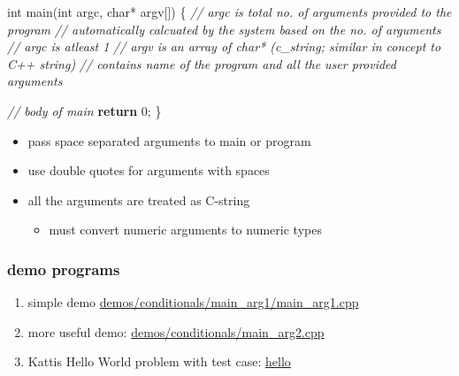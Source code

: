 \documentclass[11pt]{article}
\providecommand{\tightlist}{%
      \setlength{\itemsep}{0pt}\setlength{\parskip}{0pt}}
\newenvironment{Shaded}{}{}
\newcommand{\DataTypeTok}[1]{\textcolor[rgb]{0.56,0.13,0.00}{{#1}}}
\newcommand{\DecValTok}[1]{\textcolor[rgb]{0.25,0.63,0.44}{{#1}}}
\newcommand{\StringTok}[1]{\textcolor[rgb]{0.25,0.44,0.63}{{#1}}}
\newcommand{\CommentTok}[1]{\textcolor[rgb]{0.38,0.63,0.69}{\textit{{#1}}}}
\newcommand{\NormalTok}[1]{{#1}}
\newcommand{\ControlFlowTok}[1]{\textcolor[rgb]{0.00,0.44,0.13}{\textbf{{#1}}}}
\newcommand{\OperatorTok}[1]{\textcolor[rgb]{0.40,0.40,0.40}{{#1}}}
\newcommand{\ExtensionTok}[1]{{#1}}
\begin{document}
\begin{Shaded}
\begin{Highlighting}[]
    \DataTypeTok{int}\NormalTok{ main}\OperatorTok{(}\DataTypeTok{int}\NormalTok{ argc}\OperatorTok{,} \DataTypeTok{char}\OperatorTok{*}\NormalTok{ argv}\OperatorTok{[])} \OperatorTok{\{}
        \CommentTok{// argc is total no. of arguments provided to the program}
        \CommentTok{// automatically calcuated by the system based on the no. of arguments}
        \CommentTok{// argc is atleast 1}
        \CommentTok{// argv is an array of char* (c\_string; similar in concept to C++ string)}
        \CommentTok{// contains name of the program and all the user provided arguments}

        \CommentTok{// body of main}
        \ControlFlowTok{return} \DecValTok{0}\OperatorTok{;}
    \OperatorTok{\}}
\end{Highlighting}
\end{Shaded}

\begin{itemize}
\tightlist
\item
  pass space separated arguments to main or program
\item
  use double quotes for arguments with spaces
\item
  all the arguments are treated as C-string

  \begin{itemize}
  \tightlist
  \item
    must convert numeric arguments to numeric types
  \end{itemize}
\end{itemize}

\begin{Shaded}
\end{Shaded}

\hypertarget{demo-programs}{%
\subsubsection{demo programs}\label{demo-programs}}

\begin{enumerate}
\def\labelenumi{\arabic{enumi}.}
\tightlist
\item
  simple demo \url{demos/conditionals/main_arg1/main_arg1.cpp}
\item
  more useful demo:
  \href{demos/conditionals/main_arg2/main_arg2.cpp}{demos/conditionals/main\_arg2.cpp}
\item
  Kattis Hello World problem with test case:
  \href{https://github.com/rambasnet/KattisDemos/blob/master/hello/C\%2B\%2B/hello.cpp}{hello}
\end{enumerate}
\end{document}
